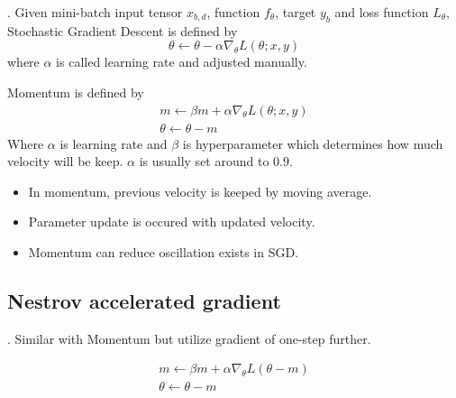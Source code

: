 \documentclass[8pt]{beamer}
\begin{document}
\begin{frame}{.}
    Given mini-batch input tensor $x_{b,d}$, function $f_\theta$, target $y_b$ and loss function $L_\theta$, Stochastic Gradient Descent is defined by
    \[
        \theta \leftarrow \theta - \alpha \nabla_\theta L (\theta; x, y)
    \]
    where $\alpha$ is called learning rate and adjusted manually.

    \bigskip
    Momentum is defined by
    \[
    \begin{gathered}
        m \leftarrow \beta m + \alpha \nabla_\theta L(\theta;x,y) \\
        \theta \leftarrow \theta  - m
    \end{gathered}
    \]
    Where $\alpha$ is learning rate and $\beta$ is hyperparameter which determines how much velocity will be keep. $\alpha$ is usually set around to $0.9$.
    \begin{itemize}
        \item In momentum, previous velocity is keeped by moving average.
        \item Parameter update is occured with updated velocity.
        \item Momentum can reduce oscillation exists in SGD.
    \end{itemize}
\end{frame}

\subsection{Nestrov accelerated gradient}
\begin{frame}{.}
    Similar with Momentum but utilize gradient of one-step further.

    \[
    \begin{gathered}
        m \leftarrow \beta m + \alpha \nabla_\theta L(\theta - m) \\
        \theta \leftarrow \theta - m
    \end{gathered}
    \]

\end{frame}
\end{document}
